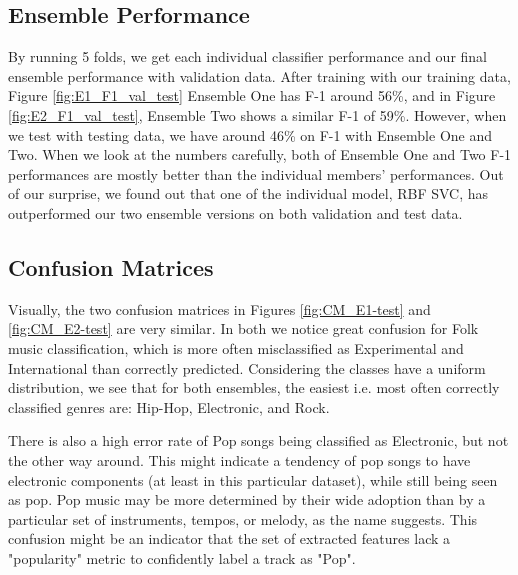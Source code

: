 \subsection{Ensemble Performance}

By running 5 folds, we get each individual classifier performance and our final ensemble performance with validation data. After training with our training data, Figure \ref{fig:E1_F1_val_test} Ensemble One has F-1 around 56\%, and in Figure \ref{fig:E2_F1_val_test}, Ensemble Two shows a similar F-1 of 59\%. However, when we test with testing data, we have around 46\% on F-1 with Ensemble One and Two. When we look at the numbers carefully, both of Ensemble One and Two F-1 performances are mostly better than the individual members' performances. Out of our surprise, we found out that one of the individual model, RBF SVC, has outperformed  our two ensemble versions on both validation and test data.

\begin{figure*}
    \centering
    \begin{minipage}{0.48\textwidth}
        \centering
        
        \caption{Ensemble One and its members' F1 performance.}
        \label{fig:E1_F1_val_test}
    \end{minipage}
    \begin{minipage}{0.48\textwidth}
        \centering
        
        \caption{Ensemble Two and its members' F1 performance.}
        \label{fig:E2_F1_val_test}
    \end{minipage}
    \par\bigskip
\end{figure*}

\subsection{Confusion Matrices}

Visually, the two confusion matrices in Figures \ref{fig:CM_E1-test} and \ref{fig:CM_E2-test} are very similar. In both we notice great confusion for Folk music classification, which is more often misclassified as Experimental and International than correctly predicted. Considering the classes have a uniform distribution, we see that for both ensembles, the easiest i.e. most often correctly classified genres are: Hip-Hop, Electronic, and Rock.

There is also a high error rate of Pop songs being classified as Electronic, but not the other way around. This might indicate a tendency of pop songs to have electronic components (at least in this particular dataset), while still being seen as pop. Pop music may be more determined by their wide adoption than by a particular set of instruments, tempos, or melody, as the name suggests. This confusion might be an indicator that the set of extracted features lack a "popularity" metric to confidently label a track as "Pop".

